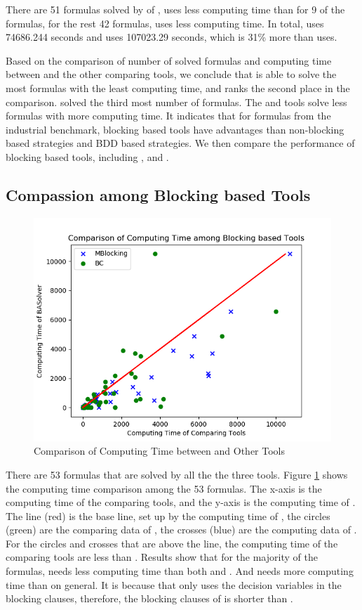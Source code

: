 There are 51 formulas solved by \tool of \bdd, \bdd uses less computing time than \tool for 9 of the formulas, for the rest 42 formulas, \tool uses less computing time. In total, \tool uses 74686.244 seconds and \bdd uses 107023.29 seconds, which is 31\% more than \tool uses.

Based on the comparison of number of solved formulas and computing time between \tool and the other comparing tools, we conclude that \tool is able to solve the most formulas with the least computing time, and \ctool ranks the second place in the comparison. 
\bc solved the third most number of formulas.
The \nbc and \bdd tools solve less formulas with more computing time. 
It indicates that for formulas from the industrial benchmark, blocking based tools have advantages than non-blocking based strategies and BDD based strategies.
We then compare the performance of blocking based tools, including \tool, \ctool and \bc.

\subsection{Compassion among Blocking based Tools}

\begin{figure}
    \centering
    \includegraphics[scale=0.5]{allsat-time.png}
    \caption{Comparison of Computing Time between \tool and Other Tools}
    \label{fig:allsat-time}
\end{figure}

There are 53 formulas that are solved by all the the three tools. Figure \ref{fig:allsat-time} shows the computing time comparison among the 53 formulas. The x-axis is the computing time of the comparing tools, and the y-axis is the computing time of \tool. The line (red) is the base line, set up by the computing time of \tool, the circles (green) are the comparing data of \bc, the crosses (blue) are the computing data of \ctool. For the circles and crosses that are above the line, the computing time of the comparing tools are less than \tool. Results show that for the majority of the formulas, \tool needs less computing time than both \ctool and \bc. And \ctool needs more computing time than \bc on general. It is because that \bc only uses the decision variables in the blocking clauses, therefore, the blocking clauses of \bc is shorter than \ctool. 

